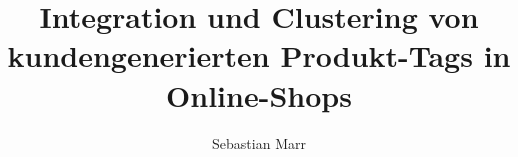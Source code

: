\documentclass[a4paper, abstracton, DIV=calc]{scrreprt}
\author{Sebastian Marr}
\title{Integration und Clustering von kundengenerierten Produkt-Tags in Online-Shops}
\begin{document}
\maketitle



\tableofcontents



\nocite{*}
\printbibliography 
\end{document}

